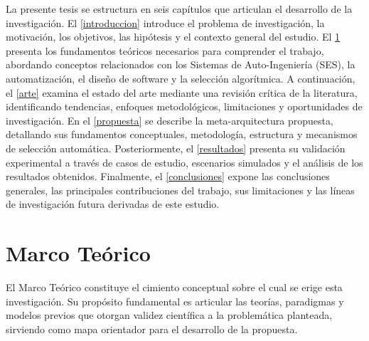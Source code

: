 \documentclass[12pt, letterpaper, oneside]{book}
\begin{document}
La presente tesis se estructura en seis capítulos que articulan el desarrollo de la investigación. El \cref{introduccion} introduce el problema de investigación, la motivación, los objetivos, las hipótesis y el contexto general del estudio. El \cref{marco} presenta los fundamentos teóricos necesarios para comprender el trabajo, abordando conceptos relacionados con los Sistemas de Auto-Ingeniería (SES), la automatización, el diseño de software y la selección algorítmica. A continuación, el \cref{arte} examina el estado del arte mediante una revisión crítica de la literatura, identificando tendencias, enfoques metodológicos, limitaciones y oportunidades de investigación. En el \cref{propuesta} se describe la meta-arquitectura propuesta, detallando sus fundamentos conceptuales, metodología, estructura y mecanismos de selección automática. Posteriormente, el \cref{resultados} presenta su validación experimental a través de casos de estudio, escenarios simulados y el análisis de los resultados obtenidos. Finalmente, el \cref{conclusiones} expone las conclusiones generales, las principales contribuciones del trabajo, sus limitaciones y las líneas de investigación futura derivadas de este estudio.


\chapter{Marco Teórico}\label{marco}

El Marco Teórico constituye el cimiento conceptual sobre el cual se erige esta investigación. Su propósito fundamental es articular las teorías, paradigmas y modelos previos que otorgan validez científica a la problemática planteada, sirviendo como mapa orientador para el desarrollo de la propuesta.
\end{document}
